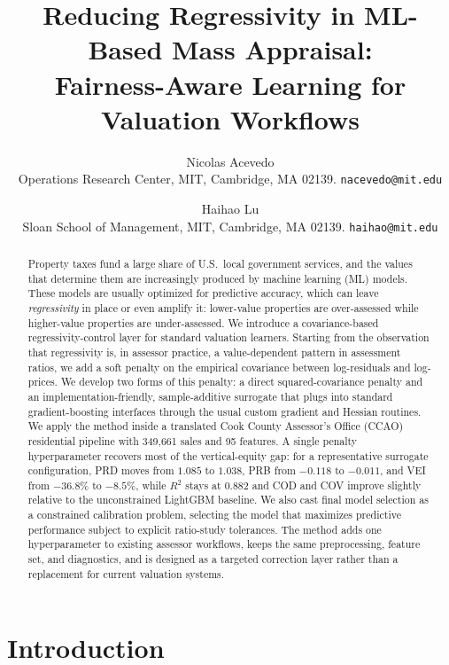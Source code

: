 \documentclass[12pt]{article}
\title{\vspace{-5mm}Reducing Regressivity in ML-Based Mass Appraisal:\\ Fairness-Aware Learning for Valuation Workflows\vspace{0mm}}
\author{
    Nicolas Acevedo\\
    {\small Operations Research Center, MIT, Cambridge, MA 02139. \texttt{nacevedo@mit.edu}}
    \and
    Haihao Lu\\
    {\small Sloan School of Management, MIT, Cambridge, MA 02139. \texttt{haihao@mit.edu}}
}
\date{
\vspace{-8mm}
}
\theoremstyle{plain}
\theoremstyle{definition}
\newcommand{\1}{\mathbf{1}}
\begin{document}
\maketitle

\begin{abstract}

Property taxes fund a large share of U.S.\ local government services, and the values that determine them are increasingly produced by machine learning (ML) models. These models are usually optimized for predictive accuracy, which can leave \emph{regressivity} in place or even amplify it: lower-value properties are over-assessed while higher-value properties are under-assessed. We introduce a covariance-based regressivity-control layer for standard valuation learners. Starting from the observation that regressivity is, in assessor practice, a value-dependent pattern in assessment ratios, we add a soft penalty on the empirical covariance between log-residuals and log-prices. We develop two forms of this penalty: a direct squared-covariance penalty and an implementation-friendly, sample-additive surrogate that plugs into standard gradient-boosting interfaces through the usual custom gradient and Hessian routines. We apply the method inside a translated Cook County Assessor's Office (CCAO) residential pipeline with 349{,}661 sales and 95 features. A single penalty hyperparameter recovers most of the vertical-equity gap: for a representative surrogate configuration, PRD moves from $1.085$ to $1.038$, PRB from $-0.118$ to $-0.011$, and VEI from $-36.8\%$ to $-8.5\%$, while $R^2$ stays at $0.882$ and COD and COV improve slightly relative to the unconstrained LightGBM baseline. We also cast final model selection as a constrained calibration problem, selecting the model that maximizes predictive performance subject to explicit ratio-study tolerances. The method adds one hyperparameter to existing assessor workflows, keeps the same preprocessing, feature set, and diagnostics, and is designed as a targeted correction layer rather than a replacement for current valuation systems.

\end{abstract}

\section{Introduction}
\end{document}
